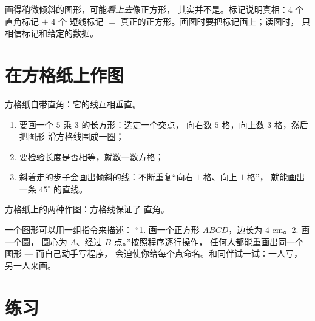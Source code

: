 \begin{example}[标记为何重要]\label{ex:g3:shapes:marks}
画得稍微倾斜的图形，可能\emph{看上去}像正方形，
其实并不是。标记说明真相：$4$ 个直角标记 $+$ $4$ 个
短线标记 $=$ 真正的正方形。画图时要把标记画上；读图时，
只相信标记和给定的数据。
\end{example}

\section{在方格纸上作图}

\begin{method}[方格中的作图]\label{met:g3:shapes:grid}
方格纸自带直角：它的线互相垂直。
\begin{enumerate}
  \item 要画一个 $5$ 乘 $3$ 的长方形：选定一个交点，
        向右数 $5$ 格，向上数 $3$ 格，然后把图形
        沿方格线围成一圈；
  \item 要检验长度是否相等，就数一数方格；
  \item 斜着走的步子会画出倾斜的线：不断重复“向右 $1$ 格、向上 $1$ 格”，
        就能画出一条 $45^\circ$ 的直线。
\end{enumerate}
\end{method}

\begin{omfigure}

{\small 方格纸上的两种作图：方格线保证了
直角。}
\end{omfigure}

\begin{example}[作图程序]\label{ex:g3:shapes:program}
一个图形可以用一组指令来描述：
“1. 画一个正方形 $ABCD$，边长为 $4$ cm。2. 画一个圆，
圆心为 $A$、经过 $B$ 点。”按照程序逐行操作，
任何人都能重画出同一个图形 --- 而自己动手写程序，
会迫使你给每个点命名。和同伴试一试：一人写，
另一人来画。
\end{example}

\section{练习}

